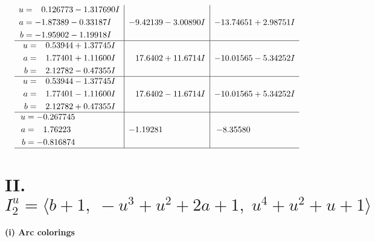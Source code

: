 \documentclass[1p]{elsarticle_modified}
\theoremstyle{definition}
\begin{document}
$$\begin{array}{c|c|c}
\begin{aligned}
u &= \phantom{-}0.126773 - 1.317690 I \\
a &= -1.87389 - 0.33187 I \\
b &= -1.95902 - 1.19918 I\end{aligned}
 & -9.42139 - 3.00890 I & -13.74651 + 2.98751 I \\ \hline\begin{aligned}
u &= \phantom{-}0.53944 + 1.37745 I \\
a &= \phantom{-}1.77401 + 1.11600 I \\
b &= \phantom{-}2.12782 - 0.47355 I\end{aligned}
 & \phantom{-}17.6402 + 11.6714 I & -10.01565 - 5.34252 I \\ \hline\begin{aligned}
u &= \phantom{-}0.53944 - 1.37745 I \\
a &= \phantom{-}1.77401 - 1.11600 I \\
b &= \phantom{-}2.12782 + 0.47355 I\end{aligned}
 & \phantom{-}17.6402 - 11.6714 I & -10.01565 + 5.34252 I \\ \hline\begin{aligned}
u &= -0.267745\phantom{ +0.000000I} \\
a &= \phantom{-}1.76223\phantom{ +0.000000I} \\
b &= -0.816874\phantom{ +0.000000I}\end{aligned}
 & -1.19281\phantom{ +0.000000I} & -8.35580\phantom{ +0.000000I}\\
 \hline 
 \end{array}$$\newpage\newpage\renewcommand{\arraystretch}{1}
\centering \section*{II. $I^u_{2}= \langle b+1,\;- u^3+u^2+2 a+1,\;u^4+u^2+u+1 \rangle$}
\flushleft \textbf{(i) Arc colorings}\\
\end{document}
